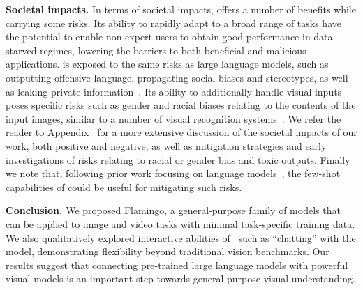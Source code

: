 \noindent
\textbf{Societal impacts.}
In terms of societal impacts, \largem{} offers a number of benefits while carrying some risks.
Its ability to rapidly adapt to a broad range of tasks have the potential to enable non-expert users to obtain
good
performance in data-starved regimes, lowering the barriers to both beneficial and malicious applications.
\largem{} is exposed to the same risks as large language models, such as outputting offensive language, propagating social biases and stereotypes, as well as leaking private information~\citep{weidinger2021harms,chinchilla}.
Its ability to additionally handle visual inputs poses specific risks such as gender and racial biases relating to the contents of the input images, similar to a number of visual recognition systems~\citep{hendricks2018women,zhao2021understanding,buolamwini2018gender,de2019does,schwemmer2020diagnosing}.
We refer the reader to Appendix~ for a more extensive discussion of the societal impacts of our work, both positive and negative;
as well as mitigation strategies and early investigations of risks relating to racial or gender bias and toxic outputs.
Finally we note that, following prior work focusing on language models~\citep{thoppilan2022lamda,perez2022red,menick2022teaching},
the few-shot capabilities of \method{} could be useful for mitigating such risks.

\noindent
\textbf{Conclusion.}
We proposed Flamingo, a general-purpose family of models that can be applied to image and video tasks with minimal task-specific training data.
We also qualitatively
explored interactive abilities of~\largem{} such as ``chatting'' with the model, demonstrating flexibility beyond traditional vision
benchmarks.
Our results suggest that connecting pre-trained large language models with powerful visual models is an important step towards general-purpose visual understanding.
